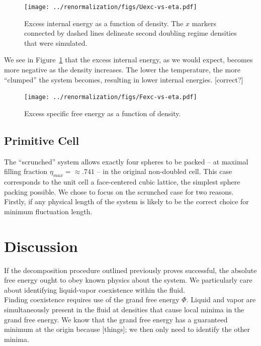 \documentclass[12pt]{article}
\begin{document}
\begin{figure}
    \centering
    \texttt{[image: ../renormalization/figs/Uexc-vs-eta.pdf]}
    \caption{Excess internal energy as a function of density. The $x$ markers connected by dashed lines delineate second doubling regime densities that were simulated.}
    \label{U-eta}
\end{figure}
We see in Figure~\ref{U-eta} that the excess internal energy, as we would expect, becomes more negative as the density increases. The lower the temperature, the more ``clumped'' the system becomes, resulting in lower internal energies. [correct?]

\begin{figure}
\centering
    \texttt{[image: ../renormalization/figs/Fexc-vs-eta.pdf]}
    \caption{Excess specific free energy as a function of density.}
    \label{F-eta}
\end{figure}

\subsection{Primitive Cell}
The ``scrunched'' system allows exactly four spheres to be packed -- at maximal filling fraction $\eta_{max} = \approx .741$ -- in the original non-doubled cell. This case corresponds to the unit cell a face-centered cubic lattice, the simplest sphere packing possible. We chose to focus on the scrunched case for two reasons. Firstly, if any physical length of the system is likely to be the correct choice for minimum fluctuation length.


\section{Discussion}
If the decomposition procedure outlined previously proves successful, the absolute free energy ought to obey known physics about the system.
We particularly care about identifying liquid-vapor coexistence within the fluid. \\

Finding coexistence requires use of the grand free energy $\Phi$. Liquid and vapor are simultaneously present in the fluid at densities that cause local minima in the grand free energy. We know that the grand free energy has a guaranteed minimum at the origin because [things]; we then only need to identify the other minima.  \\
\end{document}
